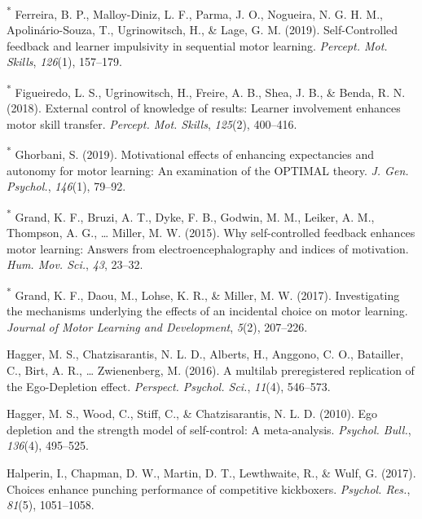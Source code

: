 \documentclass[
  english,
  man, donotrepeattitle,floatsintext]{apa7}
\newlength{\cslhangindent}
\newlength{\cslentryspacingunit} %
\newenvironment{CSLReferences}[2] %
 {%
  \setlength{\parindent}{0pt}
  \ifodd #1
  \let\oldpar\par
  \def\par{\hangindent=\cslhangindent\oldpar}
  \fi
  \setlength{\parskip}{#2\cslentryspacingunit}
 }%
 {}
\begin{document}
\begin{CSLReferences}{1}{0}
\leavevmode{}%
\textsuperscript{*} Ferreira, B. P., Malloy-Diniz, L. F., Parma, J. O., Nogueira, N. G. H. M., Apolinário-Souza, T., Ugrinowitsch, H., \& Lage, G. M. (2019). {Self-Controlled} feedback and learner impulsivity in sequential motor learning. \emph{Percept. Mot. Skills}, \emph{126}(1), 157--179.

\leavevmode{}%
\textsuperscript{*} Figueiredo, L. S., Ugrinowitsch, H., Freire, A. B., Shea, J. B., \& Benda, R. N. (2018). External control of knowledge of results: Learner involvement enhances motor skill transfer. \emph{Percept. Mot. Skills}, \emph{125}(2), 400--416.

\leavevmode{}%
\textsuperscript{*} Ghorbani, S. (2019). Motivational effects of enhancing expectancies and autonomy for motor learning: An examination of the {OPTIMAL} theory. \emph{J. Gen. Psychol.}, \emph{146}(1), 79--92.

\leavevmode{}%
\textsuperscript{*} Grand, K. F., Bruzi, A. T., Dyke, F. B., Godwin, M. M., Leiker, A. M., Thompson, A. G., \ldots{} Miller, M. W. (2015). Why self-controlled feedback enhances motor learning: Answers from electroencephalography and indices of motivation. \emph{Hum. Mov. Sci.}, \emph{43}, 23--32.

\leavevmode{}%
\textsuperscript{*} Grand, K. F., Daou, M., Lohse, K. R., \& Miller, M. W. (2017). Investigating the mechanisms underlying the effects of an incidental choice on motor learning. \emph{Journal of Motor Learning and Development}, \emph{5}(2), 207--226.

\leavevmode{}%
Hagger, M. S., Chatzisarantis, N. L. D., Alberts, H., Anggono, C. O., Batailler, C., Birt, A. R., \ldots{} Zwienenberg, M. (2016). A multilab preregistered replication of the {Ego-Depletion} effect. \emph{Perspect. Psychol. Sci.}, \emph{11}(4), 546--573.

\leavevmode{}%
Hagger, M. S., Wood, C., Stiff, C., \& Chatzisarantis, N. L. D. (2010). Ego depletion and the strength model of self-control: A meta-analysis. \emph{Psychol. Bull.}, \emph{136}(4), 495--525.

\leavevmode{}%
Halperin, I., Chapman, D. W., Martin, D. T., Lewthwaite, R., \& Wulf, G. (2017). Choices enhance punching performance of competitive kickboxers. \emph{Psychol. Res.}, \emph{81}(5), 1051--1058.


\end{CSLReferences}
\end{document}
